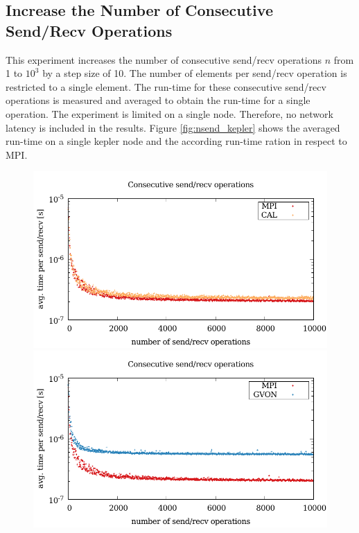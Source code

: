 \subsection*{Increase the Number of Consecutive Send/Recv Operations}
This experiment increases the number of consecutive send/recv
operations $n$ from 1 to $10^3$ by a step size of 10. The number of
elements per send/recv operation is restricted to a single
element. The run-time for these consecutive send/recv operations is
measured and averaged to obtain the run-time for a single operation.
The experiment is limited on a single node. Therefore, no network
latency is included in the results.  Figure \ref{fig:nsend_kepler}
shows the averaged run-time on a single kepler node and the according
run-time ration in respect to MPI.

\begin{figure}[H]
  \begin{minipage}[t]{0.5\textwidth} 
    \includegraphics[width=\textwidth]{plots/50_nsend_cal_kepler}
    \includegraphics[width=\textwidth]{plots/50_nsend_gvon_kepler}

\end{minipage}
\end{figure}
